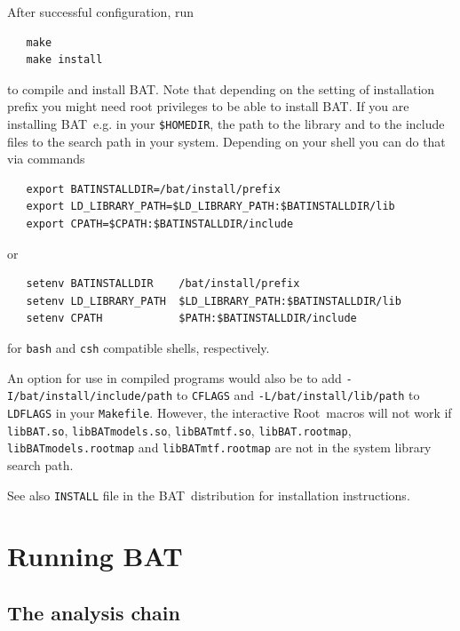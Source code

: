 \documentclass[11pt, a4paper]{article}
\newcommand{\bat}{{\sc BAT}}
\newcommand{\Root}{{\sc Root}}
\begin{document}
\enlargethispage{-\baselineskip}

After successful configuration, run
%
\begin{verbatim}
   make
   make install
\end{verbatim}
%
to compile and install \bat. Note that depending on the setting of
installation prefix you might need root privileges to be able to
install \bat. If you are installing \bat\ e.g. in your
\verb|$HOMEDIR|, %
the path to the library and to the include files to the search path in
your system. Depending on your shell you can do that via commands
%
\begin{verbatim}
   export BATINSTALLDIR=/bat/install/prefix
   export LD_LIBRARY_PATH=$LD_LIBRARY_PATH:$BATINSTALLDIR/lib
   export CPATH=$CPATH:$BATINSTALLDIR/include
\end{verbatim}
%
or
%
\begin{verbatim}
   setenv BATINSTALLDIR    /bat/install/prefix
   setenv LD_LIBRARY_PATH  $LD_LIBRARY_PATH:$BATINSTALLDIR/lib
   setenv CPATH            $PATH:$BATINSTALLDIR/include
\end{verbatim}
%
for \verb|bash| and \verb|csh| compatible shells, respectively.

An option for use in compiled programs would also be to add
\verb|-I/bat/install/include/path| to \verb|CFLAGS| and
\verb|-L/bat/install/lib/path| to \verb|LDFLAGS| in your
\verb|Makefile|. However, the interactive \Root\ macros will not work if
\verb|libBAT.so|, \verb|libBATmodels.so|, \verb|libBATmtf.so|,
\verb|libBAT.rootmap|, \verb|libBATmodels.rootmap| and
\verb|libBATmtf.rootmap| are not in the system library search path.

See also \verb|INSTALL| file in the \bat\ distribution for installation instructions.



\section{Running \bat}
\label{section:running}

\subsection{The analysis chain}
\label{subsection:chain}
\end{document}
